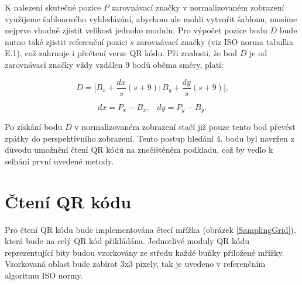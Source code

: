 K nalezení skutečné pozice $P$ zarovnávací značky v normalizovaném zobrazení
využijeme šablonového vyhledávání, abychom ale mohli vytvořit šablonu, musíme
nejprve vhodně zjistit velikost jednoho modulu. Pro výpočet pozice bodu $D$ bude
nutno také zjistit referenční pozici $s$ zarovnávací značky (viz ISO norma
tabulka E.1), což zahrnuje i přečtení verze QR kódu. Při znalosti, že bod $D$
je od zarovnávací značky vždy vzdálen 9 bodů oběma směry, platí:

\begin{equation}
  D = \bigg[ B_{x} + \frac{dx}{s}(s + 9) ; B_{y} + \frac{dy}{s}(s + 9)
  \bigg]\mbox{,}
\end{equation}

\begin{equation}
  dx = P_{x} - B_{x}\mbox{,} \quad dy = P_{y} - B_{y}\mbox{.}
\end{equation}

Po získání bodu $D$ v normalizovaném zobrazení stačí již pouze tento bod převést
zpátky do perspektivního zobrazení. Tento postup hledání 4. bodu byl navržen 
z důvodu umožnění čtení QR kódů na znečištěném podkladu, což by vedlo k selhání
první uvedené metody.

\section{Čtení QR kódu}
\label{cteniQRKodu}

Pro čtení QR kódu bude implementována čtecí mřížka (obrázek \ref{SamplingGrid}),
která bude na celý QR kód přikládána. Jednotlivé moduly  QR kódu reprezentující bity budou
vzorkovány ze středu každé buňky přiložené mřížky. Vzorkovaná oblast bude zabírat
3x3 pixely, tak je uvedeno v referenčním algoritmu ISO normy.

